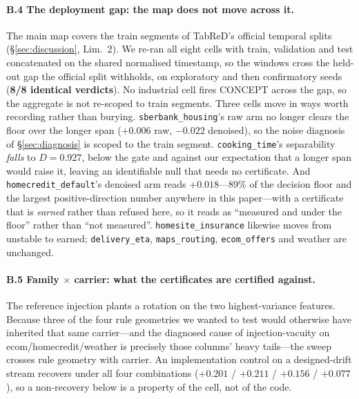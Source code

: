 \documentclass[10pt]{article} %
\begin{document}
\paragraph{B.4 The deployment gap: the map does not move across it.} The main map covers the
train segments of TabReD's official temporal splits (\S\ref{sec:discussion}, Lim.~2). We re-ran
all eight cells with train, validation and test concatenated on the shared normalised timestamp,
so the windows cross the held-out gap the official split withholds, on exploratory and then
confirmatory seeds (\textbf{8/8 identical verdicts}). No industrial cell fires CONCEPT across the
gap, so the aggregate is not re-scoped to train segments. Three cells move in ways worth recording
rather than burying. \texttt{sberbank\_housing}'s raw arm no longer clears the floor over the
longer span ($+0.006$ raw, $-0.022$ denoised), so the noise diagnosis of
\S\ref{sec:diagnosis} is scoped to the train segment. \texttt{cooking\_time}'s separability
\emph{falls} to $D = 0.927$, below the gate and against our expectation that a longer span would
raise it, leaving an identifiable null that needs no certificate. And
\texttt{homecredit\_default}'s denoised arm reads $\mathbf{+0.018}$---89\% of the decision floor
and the largest positive-direction number anywhere in this paper---with a certificate that is
\emph{earned} rather than refused here, so it reads as ``measured and under the floor'' rather
than ``not measured''. \texttt{homesite\_insurance} likewise moves from unstable to earned;
\texttt{delivery\_eta}, \texttt{maps\_routing}, \texttt{ecom\_offers} and weather are unchanged.

\paragraph{B.5 Family $\times$ carrier: what the certificates are certified against.} The
reference injection plants a rotation on the two highest-variance features. Because three of the
four rule geometries we wanted to test would otherwise have inherited that same carrier---and the
diagnosed cause of injection-vacuity on ecom/homecredit/weather is precisely those columns' heavy
tails---the sweep crosses rule geometry with carrier. An implementation control on a
designed-drift stream recovers under all four combinations ($+0.201$ / $+0.211$ / $+0.156$ /
$+0.077$), so a non-recovery below is a property of the cell, not of the code.
\end{document}

